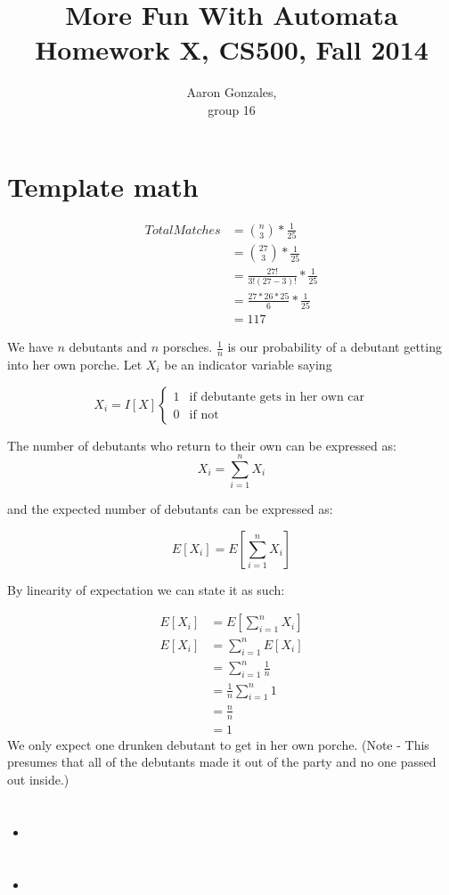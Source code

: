 \documentclass[titlepage]{article}\usepackage[]{graphicx}\usepackage[]{color}
\begin{document}
\title{More Fun With Automata \\ Homework X, CS500, Fall 2014}
\author{Aaron Gonzales, \\ group 16}
\maketitle


\section{Template math}
\begin{align*}
	Total Matches &={n \choose 3} * \frac{1}{25} \\
					&= {27 \choose 3}   * \frac{1}{25} \\
					&=   \frac{27!}{3!(27-3)!} * \frac{1}{25} \\
					&= \frac{27 * 26 * 25}{6} * \frac{1}{25}  \\
					&= 117
\end{align*}


We have $n$ debutants and $n$ porsches. 
$\frac{1}{n}$ is our probability of a debutant getting into her own porche.
Let $X_i$ be an indicator variable saying 

\[
	X_i = I[X]
	\begin{cases}
		1 & \text{if debutante gets in her own car} \\
		0 & \text{if not} 
	\end{cases}
\]

The number of debutants who return to their own can be expressed as:
\[ X_i = \sum_{i=1}^n X_i \]

and the expected number of debutants can be expressed as:

\[ E [X_i] = E \left[ \sum_{i=1}^n X_i \right] \]

By linearity of expectation we can state it as such:

\begin{align*}
	E [X_i] &= E \left[ \sum_{i=1}^n X_i \right] \\
	E [X_i] &=  \sum_{i=1}^n E[X_i] \\ 
	&=  \sum_{i=1}^n \frac{1}{n} \\ 
	&=  \frac{1}{n} \sum_{i=1}^n 1 \\
	&= \frac{n}{n} \\
	& = 1
\end{align*}
We only expect one drunken debutant to get in her own porche. (Note - This presumes
that all of the debutants made it out of the party and no one passed out
inside.)


\section{}
\begin{quote}
  \textbf{}
\end{quote}

\begin{itemize}
  \item \textbf{}
  \item \textbf{ }
\end{itemize}











  
\end{document}
